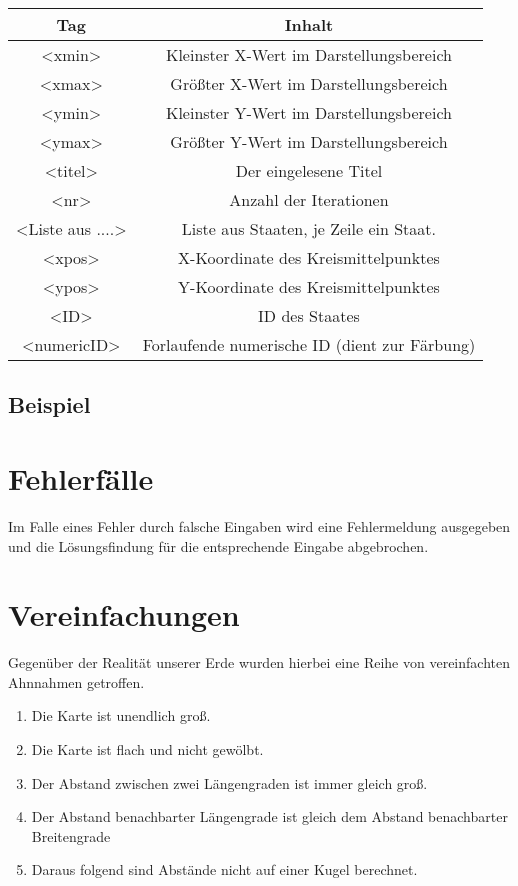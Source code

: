 \begin{center}
    \begin{tabular}{ c c }
        Tag & Inhalt  \\
        \hline
        <xmin> & Kleinster X-Wert im Darstellungsbereich  \\
        <xmax> & Größter X-Wert im Darstellungsbereich  \\
        <ymin> & Kleinster Y-Wert im Darstellungsbereich  \\
        <ymax> & Größter Y-Wert im Darstellungsbereich  \\
        <titel> & Der eingelesene Titel  \\
        <nr> & Anzahl der Iterationen  \\
        <Liste aus ....> & Liste aus Staaten, je Zeile ein Staat. \\
        <xpos> & X-Koordinate des Kreismittelpunktes  \\
        <ypos> & Y-Koordinate des Kreismittelpunktes \\
        <ID> & ID des Staates  \\
        <numericID> & Forlaufende numerische ID (dient zur Färbung)  \\
    \end{tabular}
    \end{center}

\subsection{Beispiel}



\section{Fehlerfälle}

Im Falle eines Fehler durch falsche Eingaben wird eine Fehlermeldung ausgegeben und die Lösungsfindung für die entsprechende Eingabe abgebrochen.

\section{Vereinfachungen}

Gegenüber der Realität unserer Erde wurden hierbei eine Reihe von vereinfachten Ahnnahmen getroffen.
\begin{enumerate}
    \item Die Karte ist unendlich groß.
    \item Die Karte ist flach und nicht gewölbt.
    \item Der Abstand zwischen zwei Längengraden ist immer gleich groß.
    \item Der Abstand benachbarter Längengrade ist gleich dem Abstand benachbarter Breitengrade
    \item Daraus folgend sind Abstände nicht auf einer Kugel berechnet.
\end{enumerate}
